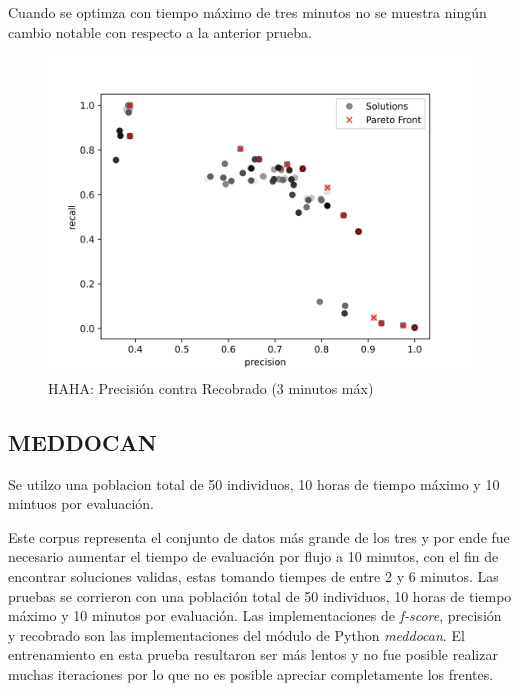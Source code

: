 Cuando se optimza con tiempo m\'aximo de tres minutos no se muestra ning\'un cambio notable con respecto a la anterior prueba. 

\begin{figure}[ht]
    \centering
    \includegraphics[scale=0.65]{Pictures/haha_precision_vs_recall_3min.jpg}
    \caption{HAHA: Precisi\'on contra Recobrado (3 minutos m\'ax)}
    \label{impl:fig:haha:precision_vs_recall_3min}
\end{figure}

\subsection{MEDDOCAN}

Se utilzo una poblacion total de 50 individuos, 10 horas de tiempo m\'aximo y 10 mintuos por  evaluaci\'on. 

Este corpus representa el conjunto de datos m\'as grande de los tres y por ende fue necesario aumentar el tiempo de evaluaci\'on por flujo a 10 minutos, con el fin de encontrar soluciones validas, estas tomando tiempes de entre 2 y 6 minutos. Las pruebas se corrieron con una poblaci\'on total de 50 individuos, 10 horas de tiempo m\'aximo y 10 minutos por evaluaci\'on. 
Las implementaciones de \textit{f-score}, precisi\'on y recobrado son las implementaciones del m\'odulo de Python \textit{meddocan}.
El entrenamiento en esta prueba resultaron ser m\'as lentos y no fue posible realizar muchas iteraciones por lo que no es posible apreciar completamente los frentes.


